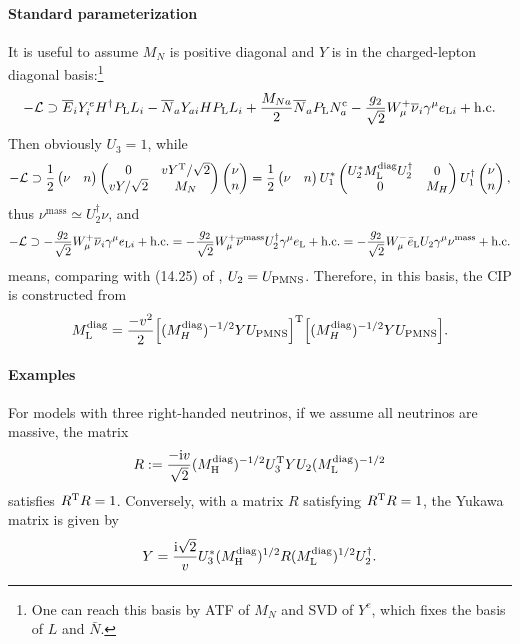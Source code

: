 \documentclass[CheatSheet]{subfiles}
\begin{document}
\paragraph{Standard parameterization}
It is useful to assume $M_N$ is positive diagonal and $Y$ is in the charged-lepton diagonal basis:\footnote{One can reach this basis by ATF of $M_N$ and SVD of $Y^e$, which fixes the basis of $L$ and $\bar N$.}
\begin{equation}
-\mathcal L\supset \overline{E}_i Y^e_i H^\dagger P_{\mathrm{L}} L_i - \overline N_a Y_{ai}HP_{\mathrm{L}} L_i + \frac{M_{Na}}2\overline{N}_aP_{\mathrm{L}} N^{\mathrm{c}}_a - \frac{g_2}{\sqrt2}W_\mu^+\overline{\nu}_i\gamma^\mu e_{{\mathrm L}i}+\text{h.c.}
\end{equation}
Then obviously $U_3=1$, while
\begin{equation}
-\mathcal L\supset
 \frac12 \begin{pmatrix}\nu & n\end{pmatrix} \begin{pmatrix}0 & v Y^{\mathrm{T}}/\sqrt2 \\ v Y/\sqrt2 & M_N\end{pmatrix} \begin{pmatrix}\nu \\ n\end{pmatrix}
= \frac12 \begin{pmatrix}\nu & n\end{pmatrix} U_1^*\begin{pmatrix}U_2^*M_{\mathrm{L}}^{\text{diag}}U_2^\dagger & 0\\0&M_H\end{pmatrix} U_1^\dagger\begin{pmatrix}\nu \\ n\end{pmatrix},
\end{equation}
thus $\nu^{\text{mass}}\simeq U_2^\dagger \nu$, and
\begin{equation}
-\mathcal L\supset - \frac{g_2}{\sqrt2}W_\mu^+\overline{\nu}_i\gamma^\mu e_{{\mathrm L}i}
+\text{h.c.}
=- \frac{g_2}{\sqrt2}W_\mu^+\overline{\nu}^{\text{mass}} U_2^\dagger\gamma^\mu e_{\mathrm{L}}
+\text{h.c.}
=
- \frac{g_2}{\sqrt2}W_\mu^-
\bar e_{\mathrm{L}} U_2\gamma^\mu {\nu}^{\text{mass}}+\text{h.c.}
\end{equation}
means, comparing with (14.25) of \cite{PDG2020}, $U_2=U_{\mathrm{PMNS}}$.
Therefore, in this basis, the CIP is constructed from
\begin{equation}
  M_{\mathrm{L}}^{\text{diag}}
=\frac{-v^2}{2}
\Bigl[(M_H^{\text{diag}})^{-1/2}YU_{\mathrm{PMNS}}\Bigr]^{\mathrm{T}}
\Bigl[(M_H^{\text{diag}})^{-1/2}YU_{\mathrm{PMNS}}\Bigr].
\end{equation}

\paragraph{Examples}
For models with three right-handed neutrinos, if we assume all neutrinos are massive, the matrix
\begin{equation}
 R:=\frac{-\mathrm{i} v}{\sqrt2}(M_{\mathrm{H}}^\text{diag})^{-1/2}U_3^{\mathrm{T}} Y U_2(M_{\mathrm{L}}^\text{diag})^{-1/2}
\end{equation}
satisfies $R^{\mathrm{T}} R=1$. Conversely, with a matrix $R$ satisfying $R^{\mathrm{T}} R=1$, the Yukawa matrix is given by
\begin{equation}
 Y = \frac{\mathrm{i}\sqrt2}{v} U_3^*(M_{\mathrm{H}}^\text{diag})^{1/2}R(M_{\mathrm{L}}^\text{diag})^{1/2}U_2^\dagger.
\label{eq:CIP}
\end{equation}
\end{document}
